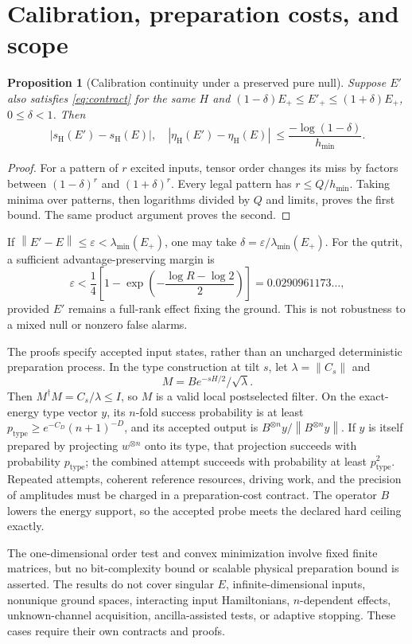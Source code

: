 \documentclass[11pt,a4paper]{article}
\newtheorem{proposition}[theorem]{Proposition}
\theoremstyle{remark}
\newcommand{\norm}[1]{\left\|#1\right\|}
\newcommand{\ep}{E_+}
\newcommand{\sh}{s_{\mathrm H}}
\newcommand{\etah}{\eta_{\mathrm H}}
\begin{document}
\section{Calibration, preparation costs, and scope}
\begin{proposition}[Calibration continuity under a preserved pure null]
\label{prop:calibration}
Suppose \(E'\) also satisfies \eqref{eq:contract} for the same \(H\) and
\((1-\delta)\ep\leq E'_+\leq(1+\delta)\ep\), \(0\leq\delta<1\).
Then
\[
 |\sh(E')-\sh(E)|,\quad
 |\etah(E')-\etah(E)|
 \ \leq\frac{-\log(1-\delta)}{h_{\min}} .
\]
\end{proposition}
\begin{proof}
For a pattern of \(r\) excited inputs, tensor order changes its miss by
factors between \((1-\delta)^r\) and \((1+\delta)^r\).
Every legal pattern has \(r\leq Q/h_{\min}\).
Taking minima over patterns, then logarithms divided by \(Q\) and limits,
proves the first bound. The same product argument proves the second.
\end{proof}
If \(\norm{E'-E}\leq\varepsilon<\lambda_{\min}(\ep)\), one may take
\(\delta=\varepsilon/\lambda_{\min}(\ep)\).
For the qutrit, a sufficient advantage-preserving margin is
\[
 \varepsilon<
 \frac14\left[1-\exp\left(-\frac{\log R-\log2}{2}\right)\right]
 =0.0290961173\ldots ,
\]
provided \(E'\) remains a full-rank effect fixing the ground.
This is not robustness to a mixed null or nonzero false alarms.

The proofs specify accepted input states, rather than an uncharged
deterministic preparation process. In the type construction at tilt \(s\),
let \(\lambda=\norm{C_s}\) and
\[
 M=Be^{-sH/2}/\sqrt{\lambda}.
\]
Then \(M^\dagger M=C_s/\lambda\leq I\), so \(M\) is a valid local
postselected filter. On the exact-energy type vector \(y\), its
\(n\)-fold success probability is at least
\(p_{\mathrm{type}}\geq e^{-C_D}(n+1)^{-D}\), and its accepted output
is \(B^{\otimes n}y/\norm{B^{\otimes n}y}\).
If \(y\) is itself prepared by projecting \(w^{\otimes n}\) onto its
type, that projection succeeds with probability \(p_{\mathrm{type}}\);
the combined attempt succeeds with probability at least
\(p_{\mathrm{type}}^2\). Repeated attempts, coherent reference resources,
driving work, and the precision of amplitudes must be charged in a
preparation-cost contract. The operator \(B\) lowers the energy support,
so the accepted probe meets the declared hard ceiling exactly.

The one-dimensional order test and convex minimization involve fixed
finite matrices, but no bit-complexity bound or scalable physical
preparation bound is asserted. The results do not cover singular \(E\),
infinite-dimensional inputs, nonunique ground spaces, interacting input
Hamiltonians, \(n\)-dependent effects, unknown-channel acquisition,
ancilla-assisted tests, or adaptive stopping. These cases require their
own contracts and proofs.
\end{document}
